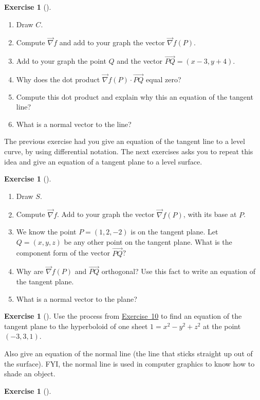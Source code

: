\documentclass[10pt,]{book}
\theoremstyle{plain}
\theoremstyle{definition}
\theoremstyle{definition}
\theoremstyle{definition}
\theoremstyle{definition}
\newtheorem{exploration}[project]{Exercise}
\theoremstyle{definition}
\numberwithin{equation}{section}
\begin{document}
\begin{exploration}[]\label{exploration-231}
\leavevmode%
\begin{enumerate}[font=\bfseries,label=(\alph*),ref=\alph*]
\item\label{task-619} Draw \(C\).%
\item\label{task-620} Compute \(\vec \nabla f\) and add to your graph the vector \(\vec \nabla f(P)\).%
\item\label{task-621} Add to your graph the point \(Q\) and the vector \(\vec {PQ} = (x-3,y+4)\).%
\item\label{task-622} Why does the dot product \(\vec \nabla f(P)\cdot\vec{PQ}\) equal zero?%
\item\label{task-623} Compute this dot product and explain why this an equation of the tangent line?%
\item\label{task-624} What is a normal vector to the line?%
\end{enumerate}
\end{exploration}
The previous exercise had you give an equation of the tangent line to a level curve, by using differential notation. The next exercises asks you to repeat this idea and give an equation of a tangent plane to a level surface.%
\begin{exploration}[]\label{prob_gradient_to_tangent_practice}
\leavevmode%
\begin{enumerate}[font=\bfseries,label=(\alph*),ref=\alph*]
\item\label{task-625} Draw \(S\).%
\item\label{task-626} Compute \(\vec \nabla f\). Add to your graph the vector \(\vec \nabla f(P)\), with its base at \(P\).%
\item\label{task-627} We know the point \(P=(1,2,-2)\) is on the tangent plane. Let \(Q=(x,y,z)\) be any other point on the tangent plane.  What is the component form of the vector \(\vec {PQ}\)?%
\item\label{task-628} Why are  \(\vec \nabla f(P)\) and \(\vec{PQ}\) orthogonal? Use this fact to write an equation of the tangent plane.%
\item\label{task-629} What is a normal vector to the plane?%
\end{enumerate}
\end{exploration}
\begin{exploration}[]\label{exploration-233}
Use the process from \hyperref[prob_gradient_to_tangent_practice]{Exercise~10} to find an equation of the tangent plane to the hyperboloid of one sheet \(1=x^2-y^2+z^2\) at the point \((-3,3,1)\).%
\par
Also give an equation of the normal line (the line that sticks straight up out of the surface). FYI, the normal line is used in computer graphics to know how to shade an object.%
\end{exploration}
\begin{exploration}[]\label{exploration-234}
\end{exploration}
\typeout{************************************************}
\typeout{************************************************}
\end{document}
